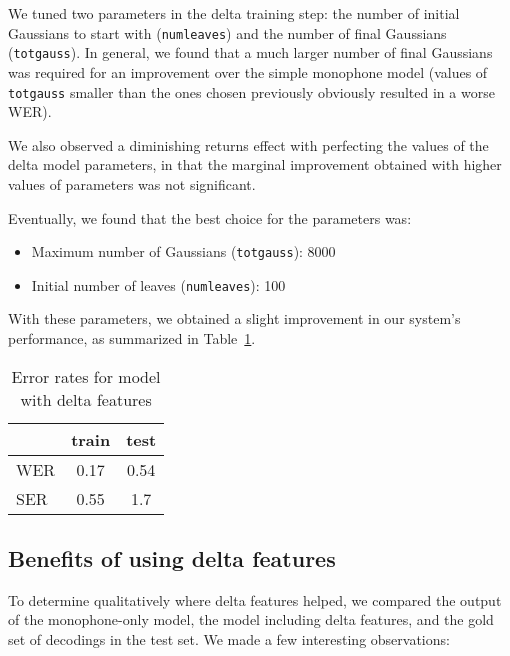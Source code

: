 \documentclass[twocolumn, 11pt]{article}
\begin{document}
We tuned two parameters in the delta training step: the number of initial
Gaussians to start with (\texttt{numleaves}) and the number of final Gaussians
(\texttt{totgauss}). In general, we found that a much larger number of final
Gaussians was required for an improvement over the simple monophone model
(values of \texttt{totgauss} smaller than the ones chosen previously obviously
resulted in a worse WER).

We also observed a diminishing returns effect with perfecting the values of the
delta model parameters, in that the marginal improvement obtained with higher
values of parameters was not significant.

Eventually, we found that the best choice for the parameters was:
\begin{itemize}
  \item Maximum number of Gaussians (\texttt{totgauss}): 8000
  \item Initial number of leaves (\texttt{numleaves}): 100
\end{itemize}

With these parameters, we obtained a slight improvement in our system's
performance, as summarized in Table~\ref{tab:wer-delta}.

\begin{table}[h]\centering
  \begin{tabular}{lcc}
    \toprule
    & train & test \\
    \midrule
    WER & 0.17 & 0.54 \\
    SER & 0.55 & 1.7 \\
    \bottomrule
  \end{tabular}
  \caption{Error rates for model with delta features}\label{tab:wer-delta}
\end{table}

\subsection{Benefits of using delta features}
To determine qualitatively where delta features helped, we compared the output
of the monophone-only model, the model including delta features, and the gold
set of decodings in the test set. We made a few interesting observations:
\end{document}
